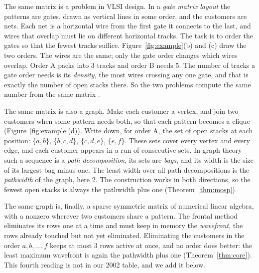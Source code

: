 The same matrix is a problem in VLSI design. In a \emph{gate matrix layout}
the patterns are gates, drawn as vertical lines in some order, and the
customers are nets. Each net is a horizontal wire from the first gate it
connects to the last, and wires that overlap must lie on different horizontal
tracks. The task is to order the gates so that the fewest tracks suffice.
Figure~\ref{fig:example}(b) and (c) draw the two orders. The wires are the same;
only the gate order changes which wires overlap. Order A packs into 3 tracks
and order B needs 5. The number of tracks a gate order needs is its
\emph{density}, the most wires crossing any one gate, and that is exactly the
number of open stacks there. So the two problems compute the same number from
the same matrix \citep[Proposition~2]{LY2002}.

The same matrix is also a graph. Make each customer a vertex, and join two
customers when some pattern needs both, so that each pattern becomes a clique
(Figure~\ref{fig:example}(d)). Write down, for order A, the set of open stacks
at each position: $\{a,b\}$, $\{b,c,d\}$, $\{c,d,e\}$, $\{e,f\}$. These sets
cover every vertex and every edge, and each customer appears in a run of
consecutive sets. In graph theory such a sequence is a \emph{path
decomposition}, its sets are \emph{bags}, and its width is the size of its
largest bag minus one. The least width over all path decompositions is the
\emph{pathwidth} of the graph, here 2. The construction works in both
directions, so the fewest open stacks is always the pathwidth plus one
(Theorem~\ref{thm:mosp}).

The same graph is, finally, a sparse symmetric matrix of numerical linear
algebra, with a nonzero wherever two customers share a pattern. The frontal
method eliminates its rows one at a time and must keep in memory the
\emph{wavefront}, the rows already touched but not yet eliminated. Eliminating
the customers in the order $a,b,\dots,f$ keeps at most 3 rows active at once,
and no order does better: the least maximum wavefront is again the pathwidth
plus one (Theorem~\ref{thm:core}). This fourth reading is not in our 2002
table, and we add it below.

